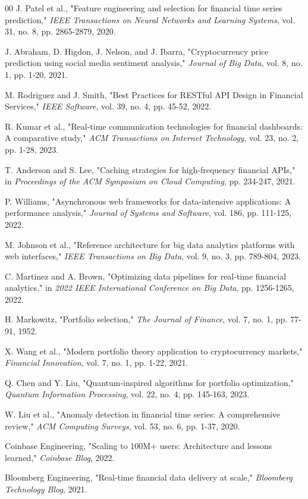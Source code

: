 \documentclass[conference]{IEEEtran}
\begin{document}
\begin{thebibliography}{00}
 J. Patel et al., "Feature engineering and selection for financial time series prediction," \textit{IEEE Transactions on Neural Networks and Learning Systems}, vol. 31, no. 8, pp. 2865-2879, 2020.

 J. Abraham, D. Higdon, J. Nelson, and J. Ibarra, "Cryptocurrency price prediction using social media sentiment analysis," \textit{Journal of Big Data}, vol. 8, no. 1, pp. 1-20, 2021.

 M. Rodriguez and J. Smith, "Best Practices for RESTful API Design in Financial Services," \textit{IEEE Software}, vol. 39, no. 4, pp. 45-52, 2022.

 R. Kumar et al., "Real-time communication technologies for financial dashboards: A comparative study," \textit{ACM Transactions on Internet Technology}, vol. 23, no. 2, pp. 1-28, 2023.

 T. Anderson and S. Lee, "Caching strategies for high-frequency financial APIs," in \textit{Proceedings of the ACM Symposium on Cloud Computing}, pp. 234-247, 2021.

 P. Williams, "Asynchronous web frameworks for data-intensive applications: A performance analysis," \textit{Journal of Systems and Software}, vol. 186, pp. 111-125, 2022.

 M. Johnson et al., "Reference architecture for big data analytics platforms with web interfaces," \textit{IEEE Transactions on Big Data}, vol. 9, no. 3, pp. 789-804, 2023.

 C. Martinez and A. Brown, "Optimizing data pipelines for real-time financial analytics," in \textit{2022 IEEE International Conference on Big Data}, pp. 1256-1265, 2022.

 H. Markowitz, "Portfolio selection," \textit{The Journal of Finance}, vol. 7, no. 1, pp. 77-91, 1952.

 X. Wang et al., "Modern portfolio theory application to cryptocurrency markets," \textit{Financial Innovation}, vol. 7, no. 1, pp. 1-22, 2021.

 Q. Chen and Y. Liu, "Quantum-inspired algorithms for portfolio optimization," \textit{Quantum Information Processing}, vol. 22, no. 4, pp. 145-163, 2023.

 W. Liu et al., "Anomaly detection in financial time series: A comprehensive review," \textit{ACM Computing Surveys}, vol. 53, no. 6, pp. 1-37, 2020.

 Coinbase Engineering, "Scaling to 100M+ users: Architecture and lessons learned," \textit{Coinbase Blog}, 2022.

 Bloomberg Engineering, "Real-time financial data delivery at scale," \textit{Bloomberg Technology Blog}, 2021.

\end{thebibliography}
\end{document}
